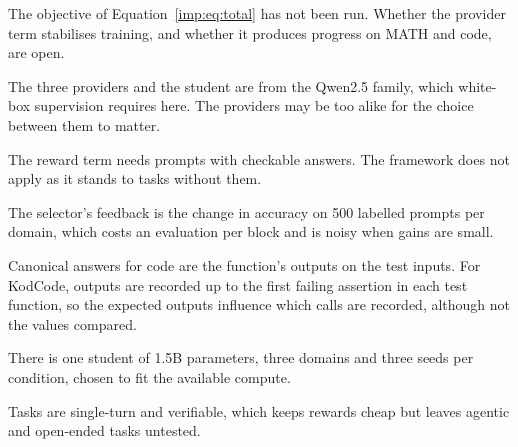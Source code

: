 \begin{description}[itemsep=3pt,topsep=4pt]
  \item[Untested objective.] The objective of Equation~\ref{imp:eq:total} has not been
    run. Whether the provider term stabilises training, and whether it produces progress
    on MATH and code, are open.
  \item[One model family.] The three providers and the student are from the Qwen2.5
    family, which white-box supervision requires here. The providers may be too alike
    for the choice between them to matter.
  \item[Ground truth in training.] The reward term needs prompts with checkable answers.
    The framework does not apply as it stands to tasks without them.
  \item[Selection-set feedback.] The selector's feedback is the change in accuracy on
    500 labelled prompts per domain, which costs an evaluation per block and is noisy
    when gains are small.
  \item[Agreement in the code domain.] Canonical answers for code are the function's
    outputs on the test inputs. For KodCode, outputs are recorded up to the first failing
    assertion in each test function, so the expected outputs influence which calls are
    recorded, although not the values compared.
  \item[Scale.] There is one student of 1.5B parameters, three domains and three seeds
    per condition, chosen to fit the available compute.
  \item[Task type.] Tasks are single-turn and verifiable, which keeps rewards cheap but
    leaves agentic and open-ended tasks untested.
\end{description}
